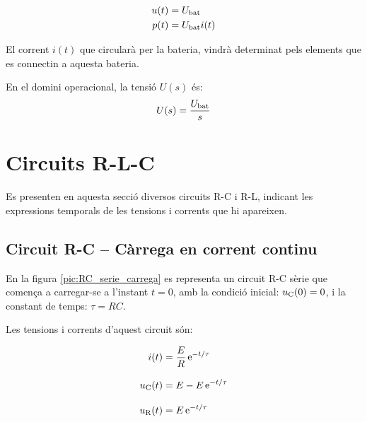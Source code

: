\hfill
\begin{minipage}[b]{5cm}
    
    \label{pic:bat}
\end{minipage}
\hfill
\begin{minipage}[b][3cm][t]{8cm}
   \begin{align}
      u(t) &= U_\mathrm{bat} \\  p(t) &= U_\mathrm{bat} i(t)
   \end{align}
\end{minipage}


El corrent $i(t)$ que circularà per la bateria, vindrà determinat
pels elements que es connectin a aquesta bateria.

 En el domini operacional, la
tensió $U(s)$ és:
\begin{equation}
   U(s) = \frac{U_\mathrm{bat}}{s}
\end{equation}


\section{Circuits R-L-C}

Es presenten en aquesta secció diversos circuits R-C i R-L, indicant les expressions temporals de les tensions i corrents que hi apareixen.

\subsection{Circuit R-C -- Càrrega en corrent continu}\label{sec:RC-carrega}

En la figura \vref{pic:RC_serie_carrega} es representa un circuit R-C sèrie que comença a carregar-se a l'instant $t=0$, amb la condició inicial: $u_\mathrm{C}(0) = 0$, i la constant de temps: $\tau = R C$.
\begin{center}
    
    \label{pic:RC_serie_carrega}
\end{center}

Les tensions i corrents d'aquest circuit són:

\hfill
\begin{minipage}[b]{9cm}
    
\end{minipage}
\hfill
\begin{minipage}[b]{6cm}
    \begin{align}
        i(t) &= \frac{E}{R}\,\mathrm{e}^{-t/\tau}\label{eq:RC-carrega} \\[3mm]
        u_\mathrm{C}(t) &= E  - E\, \mathrm{e}^{-t/\tau}  \\[3mm]
        u_\mathrm{R}(t) &= E\,\mathrm{e}^{-t/\tau}
    \end{align}
\end{minipage}


